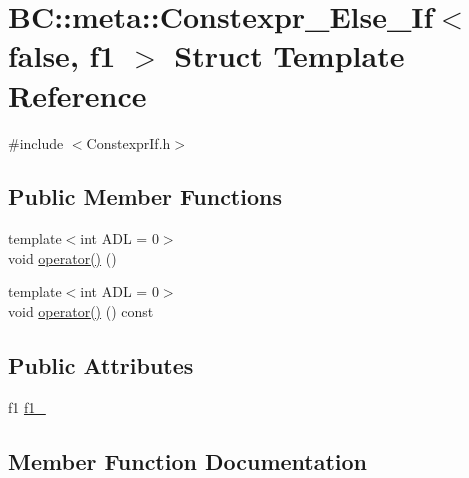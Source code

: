\hypertarget{structBC_1_1meta_1_1Constexpr__Else__If_3_01false_00_01f1_01_4}{}\section{BC\+:\+:meta\+:\+:Constexpr\+\_\+\+Else\+\_\+\+If$<$ false, f1 $>$ Struct Template Reference}
\label{structBC_1_1meta_1_1Constexpr__Else__If_3_01false_00_01f1_01_4}


{\ttfamily \#include $<$Constexpr\+If.\+h$>$}

\subsection*{Public Member Functions}
\begin{DoxyCompactItemize}
\item 
{\footnotesize template$<$int A\+DL = 0$>$ }\\void \hyperlink{structBC_1_1meta_1_1Constexpr__Else__If_3_01false_00_01f1_01_4_ab94bbbef51045d05d9719a650d90251b}{operator()} ()
\item 
{\footnotesize template$<$int A\+DL = 0$>$ }\\void \hyperlink{structBC_1_1meta_1_1Constexpr__Else__If_3_01false_00_01f1_01_4_af059d0a4de262dcfd9ad16438ec0fae4}{operator()} () const 
\end{DoxyCompactItemize}
\subsection*{Public Attributes}
\begin{DoxyCompactItemize}
\item 
f1 \hyperlink{structBC_1_1meta_1_1Constexpr__Else__If_3_01false_00_01f1_01_4_a5489897276661a6a97884446e9264ab3}{f1\+\_\+}
\end{DoxyCompactItemize}


\subsection{Member Function Documentation}
